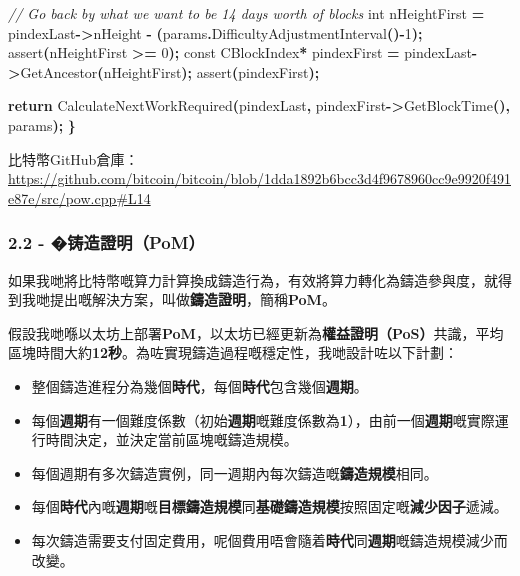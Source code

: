 \documentclass[
]{article}
\newenvironment{Shaded}{\begin{snugshade}}{\end{snugshade}}
\newcommand{\AttributeTok}[1]{\textcolor[rgb]{0.13,0.29,0.53}{#1}}
\newcommand{\CommentTok}[1]{\textcolor[rgb]{0.56,0.35,0.01}{\textit{#1}}}
\newcommand{\ControlFlowTok}[1]{\textcolor[rgb]{0.13,0.29,0.53}{\textbf{#1}}}
\newcommand{\DataTypeTok}[1]{\textcolor[rgb]{0.13,0.29,0.53}{#1}}
\newcommand{\DecValTok}[1]{\textcolor[rgb]{0.00,0.00,0.81}{#1}}
\newcommand{\NormalTok}[1]{#1}
\newcommand{\OperatorTok}[1]{\textcolor[rgb]{0.81,0.36,0.00}{\textbf{#1}}}
\newcommand{\OtherTok}[1]{\textcolor[rgb]{0.56,0.35,0.01}{#1}}
\begin{document}
\begin{Shaded}
\begin{Highlighting}[numbers=left,,]
    \CommentTok{// Go back by what we want to be 14 days worth of blocks}
    \DataTypeTok{int}\NormalTok{ nHeightFirst }\OperatorTok{=}\NormalTok{ pindexLast}\OperatorTok{{-}\textgreater{}}\NormalTok{nHeight }\OperatorTok{{-}} \OperatorTok{(}\NormalTok{params}\OperatorTok{.}\NormalTok{DifficultyAdjustmentInterval}\OperatorTok{(){-}}\DecValTok{1}\OperatorTok{);}
    \OtherTok{assert}\OperatorTok{(}\NormalTok{nHeightFirst }\OperatorTok{\textgreater{}=} \DecValTok{0}\OperatorTok{);}
    \AttributeTok{const}\NormalTok{ CBlockIndex}\OperatorTok{*}\NormalTok{ pindexFirst }\OperatorTok{=}\NormalTok{ pindexLast}\OperatorTok{{-}\textgreater{}}\NormalTok{GetAncestor}\OperatorTok{(}\NormalTok{nHeightFirst}\OperatorTok{);}
    \OtherTok{assert}\OperatorTok{(}\NormalTok{pindexFirst}\OperatorTok{);}

    \ControlFlowTok{return}\NormalTok{ CalculateNextWorkRequired}\OperatorTok{(}\NormalTok{pindexLast}\OperatorTok{,}\NormalTok{ pindexFirst}\OperatorTok{{-}\textgreater{}}\NormalTok{GetBlockTime}\OperatorTok{(),}\NormalTok{ params}\OperatorTok{);}
\OperatorTok{\}}
\end{Highlighting}
\end{Shaded}

比特幣GitHub倉庫：\url{https://github.com/bitcoin/bitcoin/blob/1dda1892b6bcc3d4f9678960cc9e9920f491e87e/src/pow.cpp\#L14}

\subsubsection{2.2 -
�铸造證明（PoM）}\label{ux94f8ux9020ux8b49ux660epom}

如果我哋將比特幣嘅算力計算換成鑄造行為，有效將算力轉化為鑄造參與度，就得到我哋提出嘅解決方案，叫做\textbf{鑄造證明}，簡稱\textbf{PoM}。

假設我哋喺以太坊上部署\textbf{PoM}，以太坊已經更新為\textbf{權益證明（PoS）}共識，平均區塊時間大約\textbf{12秒}。為咗實現鑄造過程嘅穩定性，我哋設計咗以下計劃：

\begin{itemize}
\item
  整個鑄造進程分為幾個\textbf{時代}，每個\textbf{時代}包含幾個\textbf{週期}。
\item
  每個\textbf{週期}有一個難度係數（初始\textbf{週期}嘅難度係數為\textbf{1}），由前一個\textbf{週期}嘅實際運行時間決定，並決定當前區塊嘅鑄造規模。
\item
  每個週期有多次鑄造實例，同一週期內每次鑄造嘅\textbf{鑄造規模}相同。
\item
  每個\textbf{時代}內嘅\textbf{週期}嘅\textbf{目標鑄造規模}同\textbf{基礎鑄造規模}按照固定嘅\textbf{減少因子}遞減。
\item
  每次鑄造需要支付固定費用，呢個費用唔會隨着\textbf{時代}同\textbf{週期}嘅鑄造規模減少而改變。
\end{itemize}
\end{document}
